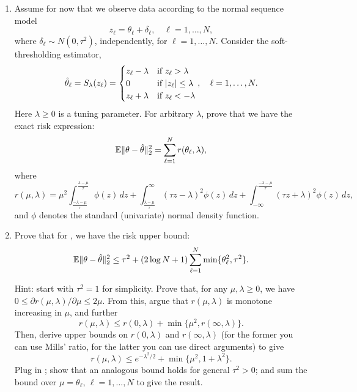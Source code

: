 \documentclass{article}
\begin{document}
\begin{enumerate}[label=(\alph*)]
\item Assume for now that we observe data according to the normal sequence model  
  \begin{equation}
  \label{eq:sequence_model}
  z_\ell = \theta_\ell + \delta_\ell, \quad \ell=1,\dots,N,  
  \end{equation}
  where $\delta_\ell \sim N(0,\tau^2)$, independently, for
  $\ell=1,\dots,N$. Consider the soft-thresholding estimator,
  \[
  \hat{\theta}_\ell = S_\lambda(z_\ell) 
  = \begin{cases}
    z_\ell-\lambda & \text{if $z_\ell > \lambda$} \\
    0 & \text{if $|z_\ell| \leq \lambda$} \\
    z_\ell+\lambda & \text{if $z_\ell < -\lambda$}
  \end{cases}, 
  \quad \ell=1,\dots,N.
  \]
  Here $\lambda \geq 0$ is a tuning parameter. For arbitrary $\lambda$, prove
  that we have the exact risk expression:
  \marginpar{\small [3 pts]}
  \[
  \mathbb{E} \|\theta - \hat{\theta}\|_2^2 = \sum_{\ell=1}^N r(\theta_\ell, \lambda),   
  \]
  where
  \[
    r(\mu,\lambda) = \mu^2
    \int_{\frac{-\lambda-\mu}{\tau}}^{\frac{\lambda-\mu}{\tau}} \phi(z) \, dz +  
    \int_{\frac{\lambda-\mu}{\tau}}^\infty (\tau z- \lambda)^2 \phi(z) \, dz + 
    \int_{-\infty}^{\frac{-\lambda-\mu}{\tau}} (\tau z + \lambda)^2 \phi(z) \,
    dz, 
  \]
    and $\phi$ denotes the standard (univariate) normal density function. 

  \item Prove that for , we have the risk
    upper bound: 
  \marginpar{\small [5 pts]}
  \[
    \mathbb{E} \|\theta - \hat{\theta}\|_2^2 \leq \tau^2 + (2\log{N}+1) \sum_{\ell=1}^N
    \min\{\theta_\ell^2, \tau^2\}.    
  \]

  Hint: start with $\tau^2=1$ for simplicity. Prove that, for any $\mu,\lambda
  \geq 0$, we have $0 \leq \partial r(\mu,\lambda) / \partial \mu \leq
  2\mu$. From this, argue that $r(\mu,\lambda)$ is monotone increasing in $\mu$,
  and further    
  \[
  r(\mu,\lambda) \leq r(0,\lambda) + \min\{\mu^2, r(\infty,\lambda)\}.  
  \]
  Then, derive upper bounds on $r(0,\lambda)$ and $r(\infty,\lambda)$ (for the
  former you can use Mills' ratio, for the latter you can use direct arguments)
  to give     
  \[
  r(\mu,\lambda) \leq e^{-\lambda^2/2} + \min\{\mu^2,1+\lambda^2\}.  
  \]
  Plug in ; show that an analogous bound
  holds for general $\tau^2>0$; and sum the bound over $\mu = \theta_\ell$,
  $\ell=1,\ldots,N$ to give the result.    


\end{enumerate}
\end{document}
